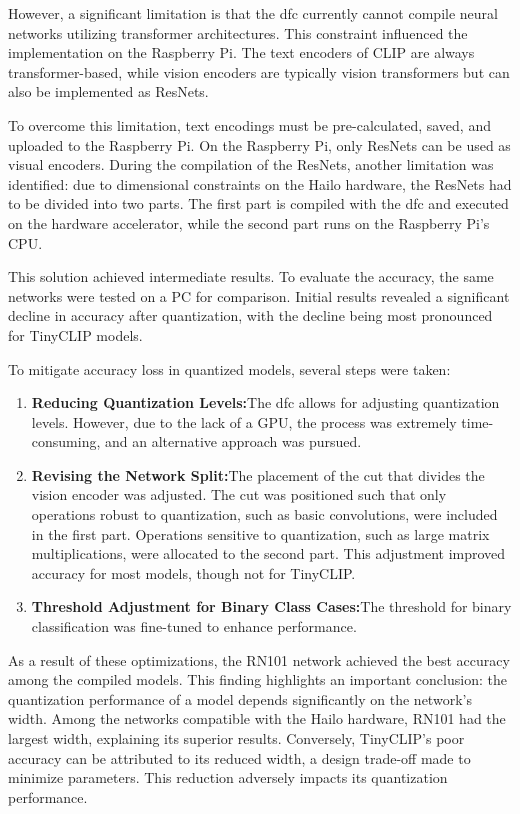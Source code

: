 However, a significant limitation is that the \acrshort{dfc} currently cannot compile neural networks utilizing transformer architectures.  
This constraint influenced the implementation on the Raspberry Pi.  
The text encoders of CLIP are always transformer-based, while vision encoders are typically vision transformers but can also be implemented as ResNets.  

To overcome this limitation, text encodings must be pre-calculated, saved, and uploaded to the Raspberry Pi.  
On the Raspberry Pi, only ResNets can be used as visual encoders.  
During the compilation of the ResNets, another limitation was identified: due to dimensional constraints on the Hailo hardware, the ResNets had to be divided into two parts.  
The first part is compiled with the \acrshort{dfc} and executed on the hardware accelerator, while the second part runs on the Raspberry Pi's CPU.  

This solution achieved intermediate results.  
To evaluate the accuracy, the same networks were tested on a PC for comparison.  
Initial results revealed a significant decline in accuracy after quantization, with the decline being most pronounced for TinyCLIP models.\hfill\break

To mitigate accuracy loss in quantized models, several steps were taken:  
\begin{enumerate}
    \item  \textbf{Reducing Quantization Levels:}The \acrshort{dfc} allows for adjusting quantization levels.  
    However, due to the lack of a GPU, the process was extremely time-consuming, and an alternative approach was pursued.
    \item \textbf{Revising the Network Split:}The placement of the cut that divides the vision encoder was adjusted.  
    The cut was positioned such that only operations robust to quantization, such as basic convolutions, were included in the first part.  
    Operations sensitive to quantization, such as large matrix multiplications, were allocated to the second part.  
    This adjustment improved accuracy for most models, though not for TinyCLIP.
    \item \textbf{Threshold Adjustment for Binary Class Cases:}The threshold for binary classification was fine-tuned to enhance performance. 
\end{enumerate}

As a result of these optimizations, the RN101 network achieved the best accuracy among the compiled models.  
This finding highlights an important conclusion: the quantization performance of a model depends significantly on the network's width.  
Among the networks compatible with the Hailo hardware, RN101 had the largest width, explaining its superior results.  
Conversely, TinyCLIP's poor accuracy can be attributed to its reduced width, a design trade-off made to minimize parameters.  
This reduction adversely impacts its quantization performance.



